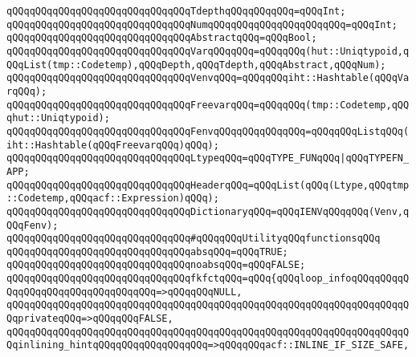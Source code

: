 \verb|qQQqqQQqqQQqqQQqqQQqqQQqqQQqqQQqTdepthqQQqqQQqqQQq=qQQqInt;|\newline
\verb|qQQqqQQqqQQqqQQqqQQqqQQqqQQqqQQqNumqQQqqQQqqQQqqQQqqQQqqQQq=qQQqInt;|\newline
\verb|qQQqqQQqqQQqqQQqqQQqqQQqqQQqqQQqAbstractqQQq=qQQqBool;|\newline
\newline
\verb|qQQqqQQqqQQqqQQqqQQqqQQqqQQqqQQqVarqQQqqQQq=qQQqqQQq(hut::Uniqtypoid,qQQqList(tmp::Codetemp),qQQqDepth,qQQqTdepth,qQQqAbstract,qQQqNum);|\newline
\verb|qQQqqQQqqQQqqQQqqQQqqQQqqQQqqQQqVenvqQQq=qQQqqQQqiht::Hashtable(qQQqVarqQQq);|\newline
\newline
\verb|qQQqqQQqqQQqqQQqqQQqqQQqqQQqqQQqFreevarqQQq=qQQqqQQq(tmp::Codetemp,qQQqhut::Uniqtypoid);|\newline
\verb|qQQqqQQqqQQqqQQqqQQqqQQqqQQqqQQqFenvqQQqqQQqqQQqqQQq=qQQqqQQqListqQQq(iht::Hashtable(qQQqFreevarqQQq)qQQq);|\newline
\newline
\newline
\newline
\verb|qQQqqQQqqQQqqQQqqQQqqQQqqQQqqQQqLtypeqQQq=qQQqTYPE_FUNqQQq|\verb#|qQQqTYPEFN_APP;#\newline
\verb|qQQqqQQqqQQqqQQqqQQqqQQqqQQqqQQqHeaderqQQq=qQQqList(qQQq(Ltype,qQQqtmp::Codetemp,qQQqacf::Expression)qQQq);|\newline
\newline
\verb|qQQqqQQqqQQqqQQqqQQqqQQqqQQqqQQqDictionaryqQQq=qQQqIENVqQQqqQQq(Venv,qQQqFenv);|\newline
\newline
\verb|qQQqqQQqqQQqqQQqqQQqqQQqqQQqqQQq#qQQqqQQqUtilityqQQqfunctionsqQQq|\newline
\newline
\verb|qQQqqQQqqQQqqQQqqQQqqQQqqQQqqQQqabsqQQq=qQQqTRUE;|\newline
\verb|qQQqqQQqqQQqqQQqqQQqqQQqqQQqqQQqnoabsqQQq=qQQqFALSE;|\newline
\newline
\verb|qQQqqQQqqQQqqQQqqQQqqQQqqQQqqQQqfkfctqQQq=qQQq{qQQqloop_infoqQQqqQQqqQQqqQQqqQQqqQQqqQQqqQQqqQQq=>qQQqqQQqNULL,|\newline
\verb|qQQqqQQqqQQqqQQqqQQqqQQqqQQqqQQqqQQqqQQqqQQqqQQqqQQqqQQqqQQqqQQqqQQqqQQqprivateqQQq=>qQQqqQQqFALSE,|\newline
\verb|qQQqqQQqqQQqqQQqqQQqqQQqqQQqqQQqqQQqqQQqqQQqqQQqqQQqqQQqqQQqqQQqqQQqqQQqinlining_hintqQQqqQQqqQQqqQQqqQQq=>qQQqqQQqacf::INLINE_IF_SIZE_SAFE,|\newline
